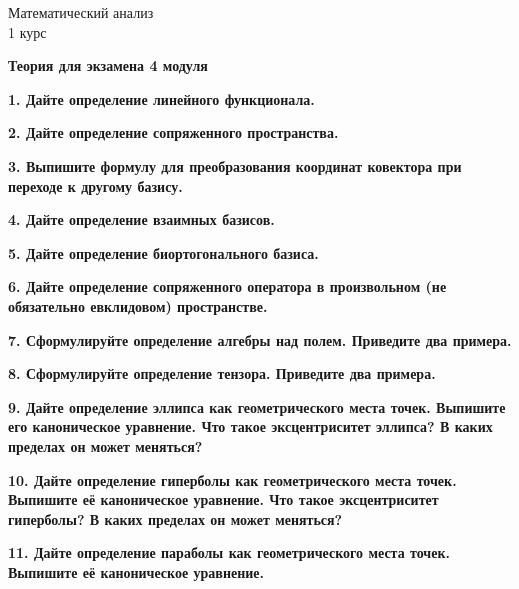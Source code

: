 \documentclass[11pt,a4paper]{article}
\begin{document}
\begin{center}

\begin{huge}
\textsf{Математический анализ\\1 курс}
\end{huge}

\vspace{5mm}

\begin{LARGE}
\textsf{\textbf{Теория для экзамена 4 модуля}}
\end{LARGE}

\end{center}

\textbf{1. Дайте определение линейного функционала.\\}

\textbf{2. Дайте определение сопряженного пространства.\\}

\textbf{3. Выпишите формулу для преобразования координат ковектора при переходе к другому базису.\\}

\textbf{4. Дайте определение взаимных базисов.\\}

\textbf{5. Дайте определение биортогонального базиса.\\}

\textbf{6. Дайте определение сопряженного оператора в произвольном (не обязательно евклидовом) пространстве.\\}

\textbf{7. Сформулируйте определение алгебры над полем. Приведите два примера.\\}

\textbf{8. Сформулируйте определение тензора. Приведите два примера.\\}

\textbf{9. Дайте определение эллипса как геометрического места точек. Выпишите его каноническое уравнение. Что такое эксцентриситет эллипса? В каких пределах он может меняться?\\}

\textbf{10. Дайте определение гиперболы как геометрического места точек. Выпишите её каноническое уравнение. Что такое эксцентриситет гиперболы? В каких пределах он может меняться?\\}

\textbf{11. Дайте определение параболы как геометрического места точек. Выпишите её каноническое уравнение.\\}
\end{document}
